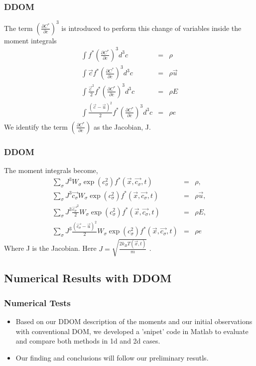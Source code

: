 \begin{frame}
	\frametitle{DDOM}
	The term $(\frac{\partial C^*}{\partial c} )^3$ is introduced to perform this change of variables inside the moment integrals
	\begin{eqnarray}
		\int f^* \left(\frac{\partial C^*}{\partial c} \right )^3 d^3 c  &=& \rho \\
		\int \vec{c} f^* \left(\frac{\partial C^*}{\partial c} \right )^3 d^3 c &=& \rho \vec{u} \nonumber \\
		\int \frac{\vec{c}^2}{2} f^* \left(\frac{\partial C^*}{\partial c} \right )^3 d^3 c  &=& \rho E \nonumber \\
		\int \frac{(\vec{c}-\vec{u})^2}{2} f^* \left(\frac{\partial C^*}{\partial c} \right )^3 d^3 c &=& \rho e \nonumber
	\end{eqnarray}
	We identify the term $\left(\frac{\partial C^*}{\partial c} \right )$ as the Jacobian, J. 
\end{frame}

\begin{frame}
	\frametitle{DDOM}
	The moment integrals become,
	\begin{eqnarray}
		\sum_\sigma J^3 W_\sigma \exp(c_\sigma^2) f^*(\vec{x},\vec{c_\sigma},t) &=&  \rho, \\
		\sum_\sigma J^3 \vec{c_\sigma} W_\sigma \exp(c_\sigma^2) f^*(\vec{x},\vec{c_\sigma},t)&=& \rho \vec{u}, \nonumber \\
		\sum_\sigma J^3 \frac{\vec{c_\sigma}^2}{2} W_\sigma \exp(c_\sigma^2) f^*(\vec{x},\vec{c_\sigma},t)&=& \rho E, \nonumber \\
		\sum_\sigma J^3 \frac{(\vec{c_\sigma}-\vec{u})^2}{2} W_\sigma \exp(c_\sigma^2) f^*(\vec{x},\vec{c_\sigma},t) &=& \rho e  \nonumber
	\end{eqnarray}
	Where J is the Jacobian. Here $J = \sqrt{\frac{2k_B T(\vec{x},t)}{m}}$ .
\end{frame}

\subsection{Numerical Results with DDOM}
\begin{frame}
	\frametitle{Numerical Tests}
	\begin{itemize}
	\item Based on our DDOM description of the moments and our initial observations with conventional DOM, we developed a 'snipet' code in Matlab to evaluate and compare both methods in 1d and 2d cases.
	\item Our finding and conclusions will follow our preliminary resutls.
	\end{itemize}	
\end{frame}

